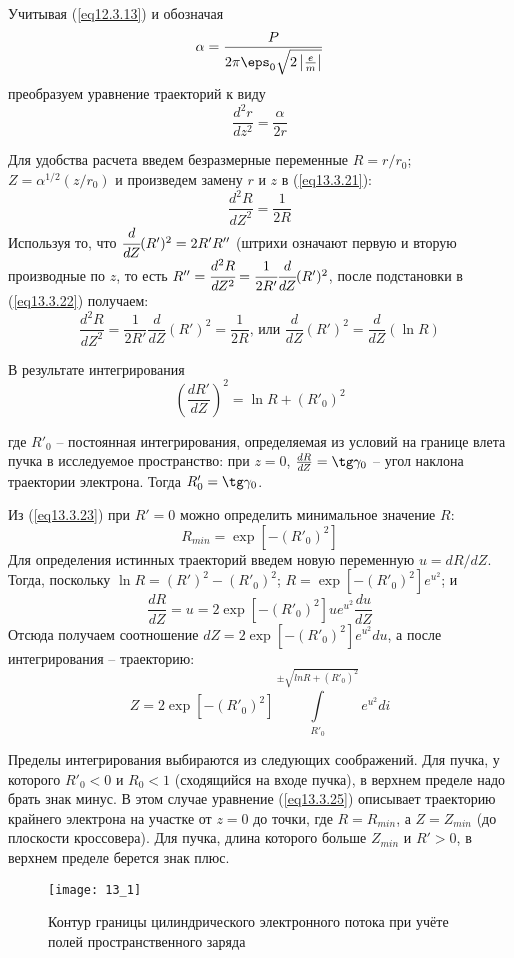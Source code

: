Учитывая (\ref{eq12.3.13}) и обозначая 
\[
	\alpha = \frac{P}{2\pi\eps_0 \sqrt{2\left|\frac{e}{m}\right|}}
\]
преобразуем уравнение траекторий к виду
\begin{equation}
	\frac{d^2 r}{dz^2} = \frac{\alpha}{2r}
	\label{eq13.3.21}
\end{equation}
 
Для удобства расчета введем безразмерные переменные \( R = r/r_0 \); 
\( Z = \alpha^{1/2}(z/r_0) \) и произведем замену \( r \) и \( z \) в 
(\ref{eq13.3.21}):
\begin{equation}
	\frac{d^2 R}{dZ^2} = \frac{1}{2R}
	\label{eq13.3.22}
\end{equation}
Используя то, что \( \cfrac{d}{dZ}(R')^2 = 2R'R'' \) (штрихи означают первую 
и вторую производные по \( z \), то есть 
\( R'' = \cfrac{d^2 R}{dZ^2} = \cfrac{1}{2R'}\cfrac{d}{dZ}(R')^2 \), после 
подстановки в (\ref{eq13.3.22}) получаем:
\[
	\frac{d^2 R}{dZ^2} = \frac{1}{2R'}\frac{d}{dZ}(R')^2 = \frac{1}{2R}
	\text{, или } \frac{d}{dZ}(R')^2 = \frac{d}{dZ}(\ln R)
\]

В результате интегрирования
\begin{equation}
	\left( \frac{dR'}{dZ} \right)^2 = \ln R + (R'_0)^2
	\label{eq13.3.23}
\end{equation}
 
где \( R'_0 \) -- постоянная интегрирования, определяемая из условий на 
границе влета пучка в исследуемое пространство: при \( z = 0 \), 
\( \frac{dR}{dZ} = \tg\gamma_0 \) -- угол наклона траектории электрона. Тогда 
\( R'_0 = \tg\gamma_0 \).

Из (\ref{eq13.3.23}) при \( R' = 0 \) можно определить минимальное значение 
\( R \):
\begin{equation}
	R_{min} = \exp\left[ -(R'_0)^2 \right]
	\label{eq13.3.24}
\end{equation}
Для определения истинных траекторий введем новую переменную \( u = dR/dZ \).
Тогда, поскольку \( \ln R = (R')^2 - (R'_0)^2 \); 
\( R = \exp\left[ -(R'_0)^2 \right] e^{u^2} \); и 
\[
	\frac{dR}{dZ} = u = 2 \exp\left[ -(R'_0)^2 \right] ue^{u^2} \frac{du}{dZ}
\]
Отсюда получаем соотношение 
\( dZ = 2 \exp\left[ -(R'_0)^2 \right] e^{u^2} du \), а после интегрирования -- 
траекторию:
\begin{equation}
	Z = 2\exp\left[ -(R'_0)^2 \right] 
		\int\limits_{R'_0}^{\pm\sqrt{ln R+(R'_0)^2}} e^{u^2} di
	\label{eq13.3.25}
\end{equation}

Пределы интегрирования выбираются из следующих соображений. Для пучка, у 
которого \( R'_0 < 0 \) и \( R_0 < 1 \)  (сходящийся на входе пучка), в
верхнем пределе надо брать знак минус. В этом случае уравнение 
(\ref{eq13.3.25}) описывает траекторию крайнего электрона на участке от 
\( z = 0 \) до точки, где \( R = R_{min} \), а \( Z = Z_{min} \) (до плоскости 
кроссовера). Для пучка, длина которого больше  \( Z_{min} \) и \( R' > 0 \), в 
верхнем пределе берется знак плюс.
\begin{figure}[h!]
	\center
	\texttt{[image: 13\_1]}
	\caption{Контур границы цилиндрического 
		электронного потока при учёте полей пространственного заряда}
	\label{img13.1}
\end{figure}

